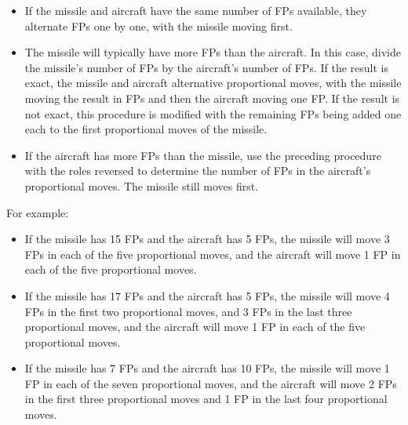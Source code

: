 {\begin{itemize}
\item If the missile and aircraft have the same number of FPs available, they alternate FPs one by one, with the missile moving first.

\item The missile will typically have more FPs than the aircraft. In this case, divide the missile's number of FPs by the aircraft's number of FPs. If the result is exact, the missile and aircraft alternative proportional moves, with the missile moving the result in FPs and then the aircraft moving one FP. If the result is not exact, this procedure is modified with the remaining FPs being added one each to the first proportional moves of the missile.

\item If the aircraft has more FPs than the missile, use the preceding procedure with the roles reversed to determine the number of FPs in the aircraft's proportional moves. The missile still moves first.

\end{itemize}

For example:
\begin{itemize}
    \item If the missile has 15 FPs and the aircraft has 5 FPs, the missile will move 3 FPs in each of the five proportional moves, and the aircraft will move 1 FP in each of the five proportional moves.
    \item If the missile has 17 FPs and the aircraft has 5 FPs, the missile will move 4 FPs in the first two proportional moves, and 3 FPs in the last three proportional moves, and the aircraft will move 1 FP in each of the five proportional moves.
    \item If the missile has 7 FPs and the aircraft has 10 FPs, the missile will move 1 FP in each of the seven proportional moves, and the aircraft will move 2 FPs in the first three proportional moves and 1 FP in the last four proportional moves.
\end{itemize}

}


